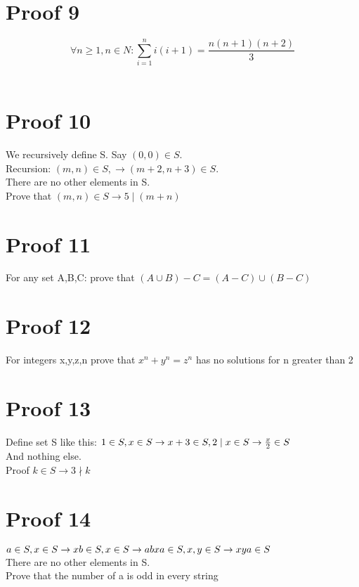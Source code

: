 \documentclass{article}
\begin{document}
\section{Proof 9}
$$\forall n\geq 1, n \in N : \sum^{n}_{i=1}i(i+1) = \frac{n(n+1)(n+2)}{3}$$\\

\section{Proof 10}
We recursively define S. Say $(0,0) \in S$. \\Recursion: $(m,n) \in S, \rightarrow (m+2,n+3) \in S$. \\There are no other elements in S. \\Prove that $ (m,n) \in S \rightarrow 5 \mid (m+n)$\\

 
\section{Proof 11}
For any set A,B,C: prove that $(A \cup B) - C = (A - C) \cup (B - C)$\\



\section{Proof 12}
For integers x,y,z,n prove that  $x^n+y^n=z^n$ has no solutions for n greater than 2\\


\section{Proof 13}
Define set S like this: $1 \in S,\\ x \in S \rightarrow x+3 \in S, \\2\mid x \in S \rightarrow \frac{x}{2} \in S$\\ And nothing else.\\
Proof $k \in S \rightarrow 3 \nmid k$ \\




\section{Proof 14}
 $a \in S, \\x \in S \rightarrow xb \in S, \\x \in S \rightarrow abxa \in S, \\x,y \in S \rightarrow xya \in S$\\
There are no other elements in S.\\
Prove that the number of a is odd in every string\\
\end{document}
